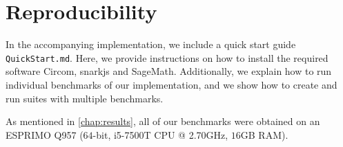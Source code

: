\chapter{Reproducibility}

In the accompanying implementation, we include a quick start guide \verb|QuickStart.md|.
Here, we provide instructions on how to install the required software Circom, snarkjs and SageMath.
Additionally, we explain how to run individual benchmarks of our implementation, and we show how to create and run suites with multiple benchmarks.

As mentioned in \cref{chap:results}, all of our benchmarks were obtained on an ESPRIMO Q957 ($64$-bit, i5-7500T CPU @ 2.70GHz, $16$GB RAM).